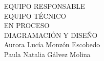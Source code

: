 {\Bold \LARGE EQUIPO RESPONSABLE}\\[2cm]
{\Bold \large \color{color1!89!black} EQUIPO TÉCNICO}\\[0.2cm]
EN PROCESO\\[0.8cm]
{\Bold \large \color{color1!89!black} DIAGRAMACIÓN Y DISEÑO}\\[0.2cm]
Aurora Lucía Monzón Escobedo\\
Paula Natalia Gálvez Molina\\[0.8cm]
